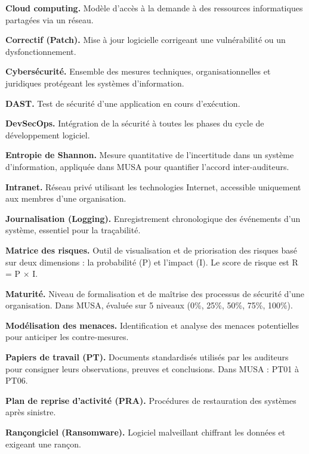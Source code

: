 \documentclass[12pt,a4paper,oneside]{report}
\begin{document}
\smallskip\noindent
\textbf{Cloud computing.} Modèle d'accès à la demande à des ressources informatiques partagées via un réseau.

\smallskip\noindent
\textbf{Correctif (Patch).} Mise à jour logicielle corrigeant une vulnérabilité ou un dysfonctionnement.

\smallskip\noindent
\textbf{Cybersécurité.} Ensemble des mesures techniques, organisationnelles et juridiques protégeant les systèmes d'information.

\smallskip\noindent
\textbf{DAST.} Test de sécurité d'une application en cours d'exécution.

\smallskip\noindent
\textbf{DevSecOps.} Intégration de la sécurité à toutes les phases du cycle de développement logiciel.

\smallskip\noindent
\textbf{Entropie de Shannon.} Mesure quantitative de l'incertitude dans un système d'information, appliquée dans MUSA pour quantifier l'accord inter-auditeurs.

\smallskip\noindent
\textbf{Intranet.} Réseau privé utilisant les technologies Internet, accessible uniquement aux membres d'une organisation.

\smallskip\noindent
\textbf{Journalisation (Logging).} Enregistrement chronologique des événements d'un système, essentiel pour la traçabilité.

\smallskip\noindent
\textbf{Matrice des risques.} Outil de visualisation et de priorisation des risques basé sur deux dimensions : la probabilité (P) et l'impact (I). Le score de risque est R = P × I.

\smallskip\noindent
\textbf{Maturité.} Niveau de formalisation et de maîtrise des processus de sécurité d'une organisation. Dans MUSA, évaluée sur 5 niveaux (0\%, 25\%, 50\%, 75\%, 100\%).

\smallskip\noindent
\textbf{Modélisation des menaces.} Identification et analyse des menaces potentielles pour anticiper les contre-mesures.

\smallskip\noindent
\textbf{Papiers de travail (PT).} Documents standardisés utilisés par les auditeurs pour consigner leurs observations, preuves et conclusions. Dans MUSA : PT01 à PT06.

\smallskip\noindent
\textbf{Plan de reprise d'activité (PRA).} Procédures de restauration des systèmes après sinistre.

\smallskip\noindent
\textbf{Rançongiciel (Ransomware).} Logiciel malveillant chiffrant les données et exigeant une rançon.
\end{document}

